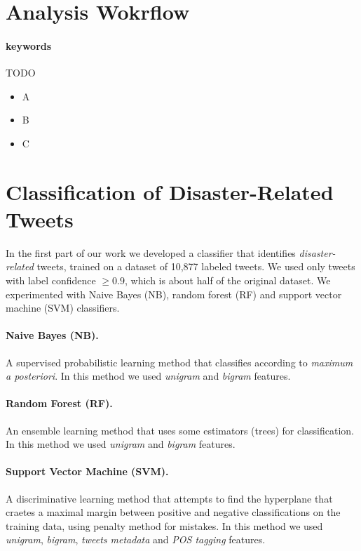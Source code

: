 \documentclass[letterpaper,twocolumn,10pt]{article}
\begin{document}
\section{Analysis Wokrflow}

\paragraph{keywords} TODO

\begin{itemize}[noitemsep,nolistsep]
	\item A
	\item B
	\item C
\end{itemize}



\section{Classification of Disaster-Related Tweets} \label{mission1}

In the first part of our work we developed a classifier that identifies \textit{disaster-related} tweets,  trained on a dataset of 10,877 labeled tweets. We used only tweets with label confidence $\geq 0.9$, which is about half of the original dataset. We experimented with Naive Bayes (NB), random forest (RF) and support vector machine (SVM) classifiers.

\paragraph{Naive Bayes (NB).}
A supervised probabilistic learning method that classifies according to \textit{maximum a posteriori}. In this method we used \textit{unigram} and \textit{bigram} features.

\paragraph{Random Forest (RF).}
An ensemble learning method that uses some estimators (trees) for classification. In this method we used \textit{unigram} and \textit{bigram} features.

\paragraph{Support Vector Machine (SVM).}
A discriminative learning method that attempts to find the hyperplane that craetes a maximal margin between positive and negative classifications on the training data, using penalty method for mistakes. In this method we used \textit{unigram}, \textit{bigram}, \textit{tweets metadata} and \textit{POS tagging} features.
\end{document}
